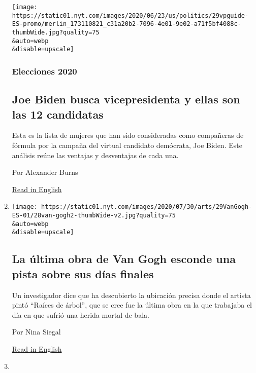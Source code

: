 \begin{enumerate}
  \texttt{[image: https://static01.nyt.com/images/2020/06/23/us/politics/29vpguide-ES-promo/merlin\_173110821\_c31a20b2-7096-4e01-9e02-a71f5bf4088c-thumbWide.jpg?quality=75\\\&auto=webp\\\&disable=upscale]}

  \hypertarget{elecciones-2020-1}{%
  \subsubsection{Elecciones 2020}\label{elecciones-2020-1}}

  \hypertarget{joe-biden-busca-vicepresidenta-y-ellas-son-las-12-candidatas}{%
  \subsection{Joe Biden busca vicepresidenta y ellas son las 12
  candidatas}\label{joe-biden-busca-vicepresidenta-y-ellas-son-las-12-candidatas}}

  Esta es la lista de mujeres que han sido consideradas como compañeras
  de fórmula por la campaña del virtual candidato demócrata, Joe Biden.
  Este análisis reúne las ventajas y desventajas de cada una.

  Por Alexander Burns

  \href{https://www.nytimes.com/article/biden-vice-president-2020.html}{Read
  in English}
\item
  \href{/es/2020/07/29/espanol/cultura/vincent-van-gogh-raices-arbol.html}{}

  \texttt{[image: https://static01.nyt.com/images/2020/07/30/arts/29VanGogh-ES-01/28van-gogh2-thumbWide-v2.jpg?quality=75\\\&auto=webp\\\&disable=upscale]}

  \hypertarget{la-uxfaltima-obra-de-van-gogh-esconde-una-pista-sobre-sus-duxedas-finales}{%
  \subsection{La última obra de Van Gogh esconde una pista sobre sus
  días
  finales}\label{la-uxfaltima-obra-de-van-gogh-esconde-una-pista-sobre-sus-duxedas-finales}}

  Un investigador dice que ha descubierto la ubicación precisa donde el
  artista pintó ``Raíces de árbol'', que se cree fue la última obra en
  la que trabajaba el día en que sufrió una herida mortal de bala.

  Por Nina Siegal

  \href{https://www.nytimes.com/2020/07/28/arts/design/vincent-van-gogh-tree-roots.html}{Read
  in English}
\item
  \href{/es/2020/07/29/espanol/america-latina/democracia-america-latina-pandemia.html}{}


\end{enumerate}
